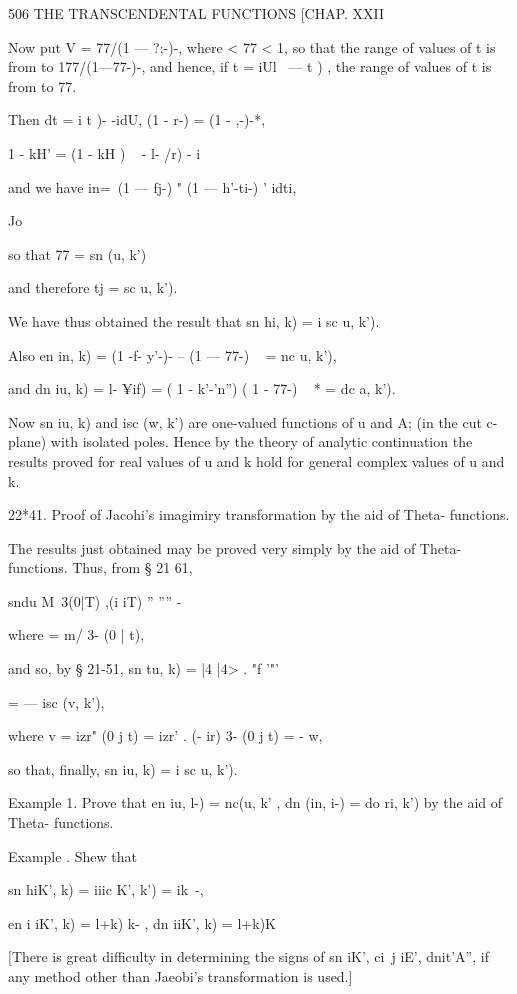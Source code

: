 506 THE TRANSCENDENTAL FUNCTIONS [CHAP. XXII 

Now put V = 77/(1 — ?;-)-, where < 77 < 1, so that the range of values 
of t is from to 177/(1—77-)-, and hence, if t = iUl \ — t ) , the range of 
values of t  is from to 77. 

Then dt = i  t )- -idU, (1 - r-)  = (1 -  ,-)-*, 

1 - kH' = (1 - kH ) ~ - l- /r) - i 

and we have in=\ (1 — fj-) "   (1 — h'-ti-) '  idti, 

Jo 

so that 77 = sn (u, k') 

and therefore tj = sc  u, k'). 

We have thus obtained the result that 
sn  hi, k) = i sc  u, k'). 

Also en  in, k) = (1 -f- y'-)- -- (1 — 77-) ~   = nc   u, k'), 

and dn  iu, k) =  l- ¥if)  = ( 1 - k'-'n'')  ( 1 - 77-) ~ * = dc  a, k'). 

Now sn  iu, k) and isc (w, k') are one-valued functions of u and A; (in the 
cut c-plane) with isolated poles. Hence by the theory of analytic continuation 
the results proved for real values of u and k hold for general complex values 
of u and k. 

22*41. Proof of Jacohi's imagimiry transformation by the aid of Theta- 
functions. 

The results just obtained may be proved very simply by the aid of 
Theta-functions. Thus, from § 21 61, 

sndu M\   3(0|T)  ,(i iT) 
 '' '''' -%

where   = m/ 3- (0 | t), 

and so, by § 21-51, sn  tu, k) = |4 |4> . "f   '"'   

= — isc (v, k'), 

where v = izr"  (0 j t) = izr' . (- ir)  3- (0 j t) = - w, 

so that, finally, sn  iu, k) = i sc  u, k'). 

Example 1. Prove that en  iu, l-) = nc(u, k' , dn (in, i-) = do ri, k') by the aid of Theta- 
functions. 

Example . Shew that 

sn  hiK', k) = iiic   K', k') = ik~-, 

en i iK', k) =  l+k)  k- , dn  iiK', k) =  l+k)K 

[There is great difficulty in determining the signs of sn  iK', ci\ j iE', dnit'A'', if any 
method other than Jaeobi's transformation is used.] 



